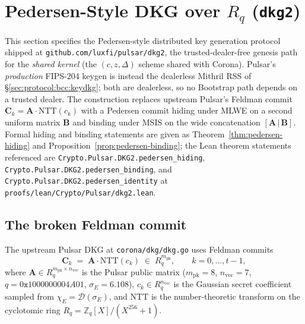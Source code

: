 \section{Pedersen-Style DKG over $R_q$ (\texttt{dkg2})}
\label{sec:pedersen-dkg}

This section specifies the Pedersen-style distributed key generation
protocol shipped at \texttt{github.com/luxfi/pulsar/dkg2}, the
trusted-dealer-free genesis path for the \emph{shared kernel} (the
$(c,z,\Delta)$ scheme shared with Corona). Pulsar's \emph{production}
FIPS-204 keygen is instead the dealerless Mithril RSS of
\S\ref{sec:protocol:bcc:keydkg}; both are dealerless, so no Bootstrap
path depends on a trusted dealer. The construction
replaces upstream Pulsar's Feldman commit
$\mathbf{C}_k = \mathbf{A}\cdot\mathrm{NTT}(c_k)$ with a Pedersen
commit hiding under MLWE on a second uniform matrix $\mathbf{B}$ and
binding under MSIS on the wide concatenation
$[\mathbf{A}\,|\,\mathbf{B}]$. Formal hiding and binding statements are
given as Theorem~\ref{thm:pedersen-hiding} and
Proposition~\ref{prop:pedersen-binding}; the Lean theorem statements
referenced are
\texttt{Crypto.Pulsar.DKG2.pedersen\_hiding},
\texttt{Crypto.Pulsar.DKG2.pedersen\_binding}, and
\texttt{Crypto.Pulsar.DKG2.pedersen\_identity} at
\texttt{proofs/lean/Crypto/Pulsar/dkg2.lean}.

\subsection{The broken Feldman commit}
\label{ssec:dkg-broken}

The upstream Pulsar DKG at \texttt{corona/dkg/dkg.go} uses Feldman
commits
\begin{equation}
\label{eq:feldman-broken}
\mathbf{C}_k \;=\; \mathbf{A}\cdot\mathrm{NTT}(c_k) \;\in\; R_q^{m_{\textrm{pk}}},
\qquad k = 0,\dots,t-1,
\end{equation}
where $\mathbf{A} \in R_q^{m_{\textrm{pk}} \times n_{\textrm{vec}}}$ is
the Pulsar public matrix
($m_{\textrm{pk}} = 8$, $n_{\textrm{vec}} = 7$,
$q = 0\mathtt{x}1000000004A01$, $\sigma_E = 6.108$),
$c_k \in R_q^{n_{\textrm{vec}}}$ is the Gaussian secret coefficient
sampled from $\chi_E = \mathcal{D}(\sigma_E)$, and $\mathrm{NTT}$ is the
number-theoretic transform on the cyclotomic ring $R_q = \mathbb{Z}_q[X]/(X^{256}+1)$.

